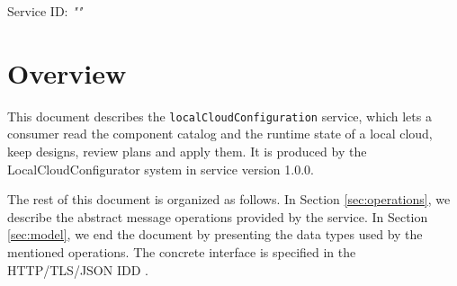 \documentclass[a4paper]{arrowhead}
\begin{document}
\sloppy

\ArrowheadSetup

\begin{center}
  \vspace*{1cm}
  \huge{\arrowtitle}

  \vspace*{0.2cm}
  \LARGE{\arrowtype}
  \vspace*{1cm}

  \Large{Service ID: \textit{"\arrowid"}}

  \vspace*{\fill}


  \vspace*{1cm}
  \vspace*{\fill}

  \begin{abstract}
    This document describes the \texttt{local\allowbreak{}Cloud\allowbreak{}Configuration} service, version 1.0.0, produced by the LocalCloudConfigurator support system of Arrowhead 5.2.2.
  \end{abstract}

  \vspace*{1cm}
\end{center}

\newpage

\tableofcontents
\newpage

\section{Overview}
\label{sec:overview}

This document describes the \texttt{local\allowbreak{}Cloud\allowbreak{}Configuration} service, which lets a consumer read the component catalog and the runtime state of a local cloud, keep designs, review plans and apply them. It is produced by the LocalCloudConfigurator system \cite{lcc-sysd} in service version 1.0.0.

The rest of this document is organized as follows.
In Section \ref{sec:operations}, we describe the abstract message operations provided by the service.
In Section \ref{sec:model}, we end the document by presenting the data types used by the mentioned operations.
The concrete interface is specified in the HTTP/TLS/JSON IDD \cite{lcc-localCloudConfiguration-http-idd}.
\end{document}
